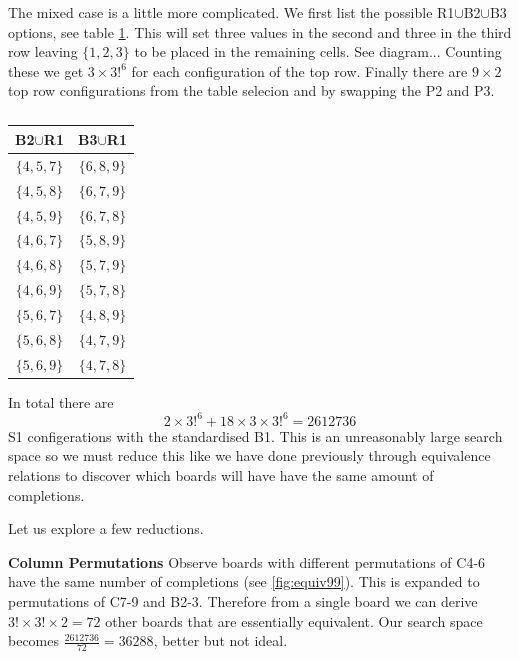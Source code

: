 \documentclass[a4paper,11pt]{report}
\newcounter{row}
\begin{document}
The mixed case is a little more complicated. We first list the possible R1$\cup$B2$\cup$B3 options, see table \ref{table:mixed99}. This will set three values in the second and three in the third row leaving $\{1,2,3\}$ to be placed in the remaining cells. See diagram... Counting these we get $3\times3!^6$ for each configuration of the top row. Finally there are $9\times 2$ top row configurations from the table selecion and by swapping the P2 and P3. 

\begin{table}[!h]
\begin{center}
\begin{tabular}{ |c|c| }
 \hline
B2$\cup$R1  & B3$\cup$R1\\
 \hline
$\{4,5,7\}$&$\{6,8,9\}$\\
$\{4,5,8\}$&$\{6,7,9\}$\\
$\{4,5,9\}$&$\{6,7,8\}$\\
$\{4,6,7\}$&$\{5,8,9\}$\\
$\{4,6,8\}$&$\{5,7,9\}$\\
$\{4,6,9\}$&$\{5,7,8\}$\\
$\{5,6,7\}$&$\{4,8,9\}$\\
$\{5,6,8\}$&$\{4,7,9\}$\\
$\{5,6,9\}$&$\{4,7,8\}$\\
\hline
\end{tabular}
\end{center}
\caption{\label{table:mixed99}}
\end{table}

In total there are
\begin{equation}2\times3!^6+18\times 3\times 3!^6 = 2612736\end{equation}
S1 configerations with the standardised B1. This is an unreasonably large search space so we must reduce this like we have done previously through equivalence relations to discover which boards will have have the same amount of completions. 

Let us explore a few reductions.

\textbf{Column Permutations}
Observe boards with different permutations of C4-6 have the same number of completions (see \ref{fig:equiv99}). This is expanded to permutations of C7-9 and B2-3. Therefore from a single board we can derive $3!\times3!\times2=72$ other boards that are essentially equivalent. Our search space becomes $\frac{2612736}{72}=36288$, better but not ideal.
\end{document}
